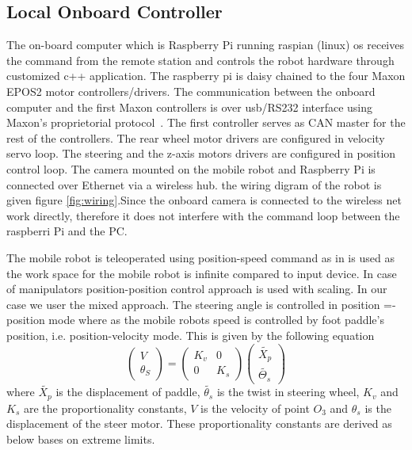 \subsection{Local Onboard Controller}
The  on-board computer which is Raspberry Pi running raspian (linux) os receives the command from the remote station and controls the robot hardware through customized c++ application.
The raspberry pi  is daisy chained to the four Maxon EPOS2 motor controllers/drivers. The communication between the onboard computer and the first Maxon controllers is over usb/RS232 interface using Maxon's proprietorial protocol~\cite{maxonrs232}. The first controller serves as CAN master for the rest of the controllers. The rear wheel motor drivers are configured in velocity servo loop. The steering and the z-axis motors drivers are configured in position control loop.  The camera mounted on the mobile robot  and Raspberry Pi  is connected over Ethernet via a wireless hub. the wiring digram of the robot is given figure \ref {fig:wiring}.Since the onboard camera is connected to the wireless net work directly, therefore it does not interfere with the command loop between the raspberri Pi and the PC. 

The mobile robot is teleoperated using position-speed command as in \cite{farkhatdinov2007hybrid} is used as the work space for the mobile robot is infinite compared to input device. In case of manipulators position-position control approach is used with scaling. In our case we user the mixed approach. The steering angle is controlled in position =-position mode where as the mobile robots speed is controlled by foot paddle's position, i.e. position-velocity mode. This is given by the following equation 
\begin{equation}
	\begin{pmatrix}
	V\\\theta_S
	\end{pmatrix}=
	\begin{pmatrix}
	K_v & 0\\0 & K_s
	\end{pmatrix}
	\begin{pmatrix}
	\tilde{X_p}\\
	\tilde{\Theta_s}
	\end{pmatrix}
\end{equation}
where $\tilde{X_p}$ is the displacement of  paddle, $\tilde{\theta_s}$ is the twist in steering wheel, $K_v$ and $K_s$ are the proportionality constants, $V$ is the velocity of point $O_3$ and $\theta_s$ is the displacement of the steer motor. These proportionality constants are derived as below bases on extreme limits. 

